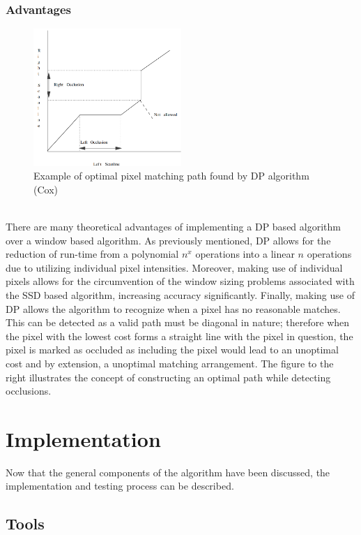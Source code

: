 \documentclass[11pt]{scrartcl}
\begin{document}
\subsubsection{Advantages}

\begin{figure}
  \includegraphics[width=0.5\textwidth]{dpG.png}
    \caption{\label{fig:frog1} Example of optimal pixel matching path found by DP algorithm (Cox)}
\end{figure}
\\ 
There are many theoretical advantages of implementing
a DP based algorithm over a window based algorithm. 
As previously mentioned, DP allows for the reduction 
of run-time from a polynomial $n^x$ operations into 
a linear $n$ operations due to utilizing individual 
pixel intensities. Moreover, making use of individual pixels 
allows for the circumvention of the window sizing problems 
associated with the SSD based algorithm, increasing accuracy 
significantly. Finally, making use of DP allows the algorithm 
to recognize when a pixel has no reasonable matches. This can be detected 
as a valid path must be diagonal in nature; therefore when the pixel with the 
lowest cost forms a straight line with the pixel in question, the pixel is marked 
as occluded as including the pixel would lead to an unoptimal cost and by extension, 
a unoptimal matching arrangement. The figure to the right illustrates the concept 
of constructing an optimal path while detecting occlusions. 



\section{Implementation}
Now that the general components of the algorithm have been discussed, the implementation 
and testing process can be described. 

\subsection{Tools}
\end{document}
